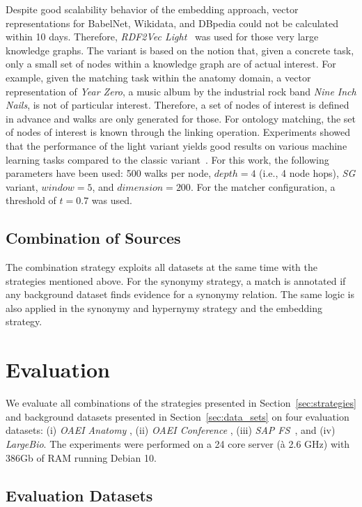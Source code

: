 \documentclass[runningheads]{llncs}
\begin{document}
Despite good scalability behavior of the embedding approach, vector representations for BabelNet, Wikidata, and DBpedia could not be calculated within 10 days. Therefore, \emph{RDF2Vec Light}~\cite{DBLP:conf/semweb/PortischHP20} was used for those very large knowledge graphs. The variant is based on the notion that, given a concrete task, only a small set of nodes within a knowledge graph are of actual interest. For example, given the matching task within the anatomy domain, a vector representation of \emph{Year Zero}, a music album by the industrial rock band \emph{Nine Inch Nails}, is not of particular interest. Therefore, a set of nodes of interest is defined in advance and walks are only generated for those. For ontology matching, the set of nodes of interest is known through the linking operation. Experiments showed that the performance of the light variant yields good results on various machine learning tasks compared to the classic variant~\cite{DBLP:conf/semweb/PortischHP20}.
For this work, the following parameters have been used: 500 walks per node, $depth=4$ (i.e., 4 node hops), \emph{SG} variant, $window=5$, and $dimension=200$. For the matcher configuration, a threshold of $t=0.7$ was used.


\subsection{Combination of Sources}
\label{ssec:combination_strategy}
The combination strategy exploits all datasets at the same time with the strategies mentioned above. For the synonymy strategy, a match is annotated if any background dataset finds evidence for a synonymy relation. The same logic is also applied in the synonymy and hypernymy strategy and the embedding strategy. 

\section{Evaluation}
\label{sec:evaluation}
We evaluate all combinations of the strategies presented in Section~\ref{sec:strategies} and background datasets presented in Section~\ref{sec:data_sets} on four evaluation datasets: (i) \textit{OAEI Anatomy} \cite{anatomy_original}, (ii) \textit{OAEI Conference} \cite{conference_original}, (iii) \textit{SAP FS}~\cite{banking_evaluation}, and (iv) \emph{LargeBio}. The experiments were performed on a 24 core server (à 2.6 GHz) with 386Gb of RAM running Debian 10.

\subsection{Evaluation Datasets}
\end{document}
